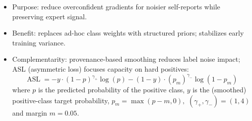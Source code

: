 \documentclass[a0paper,portrait]{baposter}
\begin{document}
\begin{poster}
{\begin{itemize}
\item Purpose: reduce overconfident gradients for noisier self-reports while preserving expert signal.
\item Benefit: replaces ad-hoc class weights with structured priors; stabilizes early training variance.
\item Complementarity: provenance-based smoothing reduces label noise impact; ASL (asymmetric loss) focuses capacity on hard positives:
\begingroup
\setlength{\abovedisplayskip}{2pt}  %
\setlength{\belowdisplayskip}{2pt}  %
\[
\operatorname{ASL} = -y \cdot (1-p)^{\gamma_{+}} \log(p) - (1-y) \cdot (p_m)^{\gamma_{-}} \log(1-p_m)
\]
\endgroup
where $p$ is the predicted probability of the positive class, $y$ is the (smoothed) positive-class target probability, $p_m = \max(p - m, 0),$ $(\gamma_{+},\gamma_{-})=(1,4)$ and margin $m=0.05$.
\end{itemize}

}


\end{poster}
\end{document}
